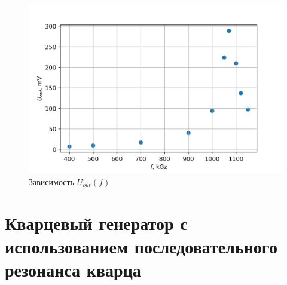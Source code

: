 \documentclass[a4paper]{article}
\begin{document}
\begin{enumerate}
    
    \begin{figure}[H]
        \begin{center}
            \includegraphics[scale = 1]{gr2.png}
            \caption{Зависимость $U_{out}(f)$}
            \label{gr2}
        \end{center}
    \end{figure}

\end{enumerate}



\section{Кварцевый генератор с использованием последовательного резонанса кварца}
\end{document}
